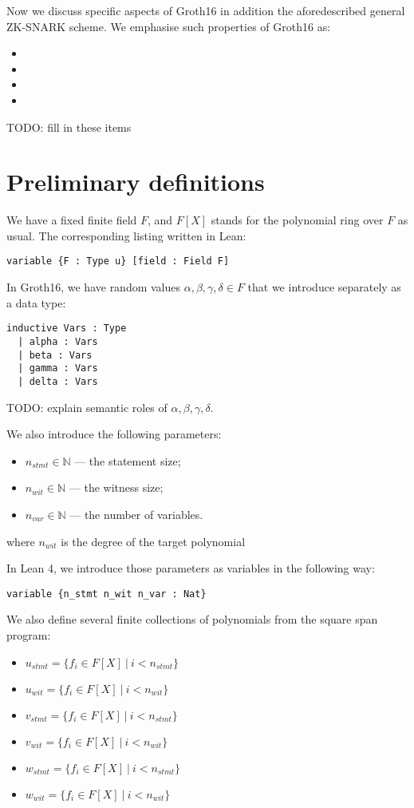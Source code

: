 \documentclass{article}
\theoremstyle{definition}
\theoremstyle{remark}
\begin{document}
Now we discuss specific aspects of Groth16 in addition the aforedescribed general ZK-SNARK scheme.
We emphasise such properties of Groth16 as:
\begin{itemize}
\item
\item
\item
\item
\end{itemize}
TODO: fill in these items

\section{Preliminary definitions}

We have a fixed finite field $F$, and $F[X]$ stands for the polynomial ring over $F$ as usual. The corresponding listing written in Lean:

\begin{lstlisting}
variable {F : Type u} [field : Field F]
\end{lstlisting}

In Groth16, we have random values $\alpha, \beta, \gamma, \delta \in F$ that we introduce separately as a data type:
\begin{lstlisting}
inductive Vars : Type
  | alpha : Vars
  | beta : Vars
  | gamma : Vars
  | delta : Vars
\end{lstlisting}
TODO: explain semantic roles of $\alpha, \beta, \gamma, \delta$.

We also introduce the following parameters:

\begin{itemize}
\item $n_{stmt} \in \mathbb{N}$ --- the statement size;
\item $n_{wit} \in \mathbb{N}$ --- the witness size;
\item $n_{var} \in \mathbb{N}$ --- the number of variables.
\end{itemize}
where $n_{wit}$ is the degree of the target polynomial

In Lean 4, we introduce those parameters as variables in the following way:

\begin{lstlisting}
variable {n_stmt n_wit n_var : Nat}
\end{lstlisting}

We also define several finite collections of polynomials from the square span program:

\begin{itemize}
\item $u_{stmt} = \{ f_{i} \in F[X] \: | \: i < n_{stmt} \}$
\item $u_{wit} = \{ f_{i} \in F[X] \: | \: i < n_{wit} \}$
\item $v_{stmt} = \{ f_{i} \in F[X] \: | \: i < n_{stmt} \}$
\item $v_{wit} = \{ f_{i} \in F[X] \: | \: i < n_{wit} \}$
\item $w_{stmt} = \{ f_{i} \in F[X] \: | \: i < n_{stmt} \}$
\item $w_{wit} = \{ f_{i} \in F[X] \: | \: i < n_{wit} \}$
\end{itemize}
\end{document}
